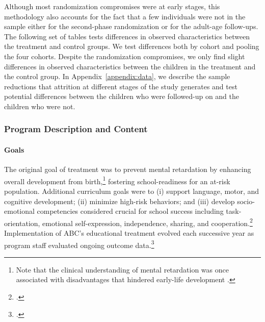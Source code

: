 \begin{appendices}
\noindent Although most randomization compromises were at early stages, this methodology also accounts for the fact that a few individuals were not in the sample either for the second-phase randomization or for the adult-age follow-ups. The following set of tables tests differences in observed characteristics between the treatment and control groups. We test differences both by cohort and pooling the four cohorts. Despite the randomization compromises, we only find slight differences in observed characteristics between the children in the treatment and the control group. In Appendix~\ref{appendix:data}, we describe the sample reductions that attrition at different stages of the study generates and test potential differences between the children who were followed-up on and the children who were not.\\

\subsubsection{Program Description and Content}

\paragraph{Goals}
\noindent The original goal of treatment was to prevent mental retardation by enhancing overall development from birth,\footnote{Note that the clinical understanding of mental retardation was once associated with disadvantages that hindered early-life development \citep{Mental-Retardation_America_2004_BOOK_NYU}.} fostering school-readiness for an at-risk population. Additional curriculum goals were to (i) support language, motor, and cognitive development; (ii) minimize high-risk behaviors; and (iii) develop socio-emotional competencies considered crucial for school success including task-orientation, emotional self-expression, independence, sharing, and cooperation.\footnote{\citet{Sparling_1974_Synth_Edu_Infant_SPEECH,Ramey_Collier_etal_1976_CarolinaAbecedarianProject,Ramey-etal_2012-ABC}.} Implementation of ABC's educational treatment evolved each successive year as program staff evaluated ongoing outcome data.\footnote{ \citet{McGinness_1982_Language-Poverty-Child,Haskins_1985_CD,Finkelstein_1982_Day_Care_YC,Ramey-etal_1975_AJoMD}.}\\



\end{appendices}

